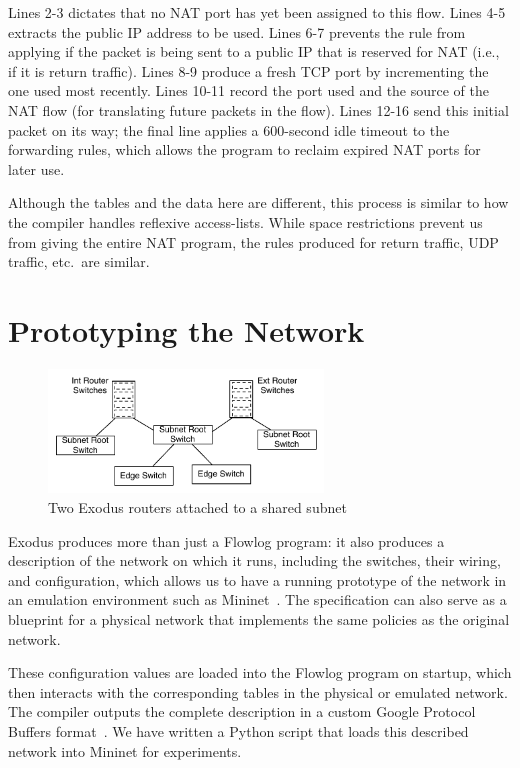 \noindent
Lines 2-3 dictates that no NAT port has yet been assigned to this
flow. Lines 4-5 extracts the public IP address to be used. Lines 6-7
prevents the rule from applying if the packet is being sent to a
public IP that is reserved for NAT (i.e., if it is return
traffic). Lines 8-9 produce a fresh TCP port by incrementing the one used most recently. Lines 10-11 record the port
used and the source of the NAT flow (for translating future packets in
the flow). Lines 12-16 send this initial packet on its way; the final
 line applies a 600-second idle timeout to the forwarding
rules, which allows the program to reclaim expired NAT ports for later
use.

Although the tables and the data here are different, this process is similar
to how the compiler handles reflexive access-lists. While space restrictions prevent us
from giving the entire NAT program, the rules produced for return traffic, UDP
traffic, etc.\ are similar.

\section{Prototyping the Network}
\label{sec:prototyping}

\begin{figure}
  \centering
  \includegraphics[width=0.65\textwidth]{figs/flowlog-network.pdf}
  \caption{Two Exodus routers attached to a shared subnet}
  \label{fig:flowlog-network}
\end{figure}

Exodus produces more than just a Flowlog program: it also produces a
description of the network on which it runs, including the switches, their
wiring, and configuration, which allows us to have a running prototype of the
network in an emulation environment such as Mininet~\cite{Mininet}. The specification can also
serve as a blueprint for a physical network that implements the same policies
as the original network.

These configuration values are loaded into the Flowlog program on startup,
which then interacts with the corresponding tables in the physical or
emulated network.  The compiler outputs the complete description in a custom
Google Protocol Buffers format~\cite{protobufs}.  We have written a Python
script that loads this described network into Mininet for experiments.

